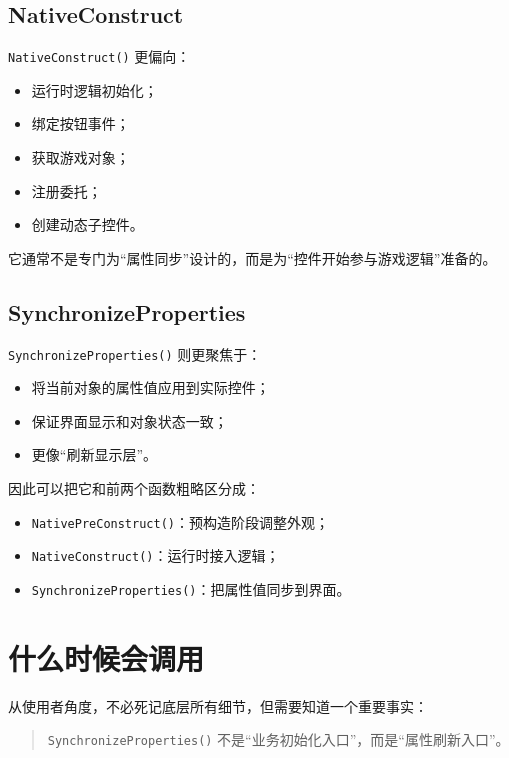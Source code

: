 \documentclass[10pt,CJKmath]{ctexart}
\begin{document}
\subsection{NativeConstruct}

\texttt{NativeConstruct()} 更偏向：

\begin{itemize}
	\item 运行时逻辑初始化；
	\item 绑定按钮事件；
	\item 获取游戏对象；
	\item 注册委托；
	\item 创建动态子控件。
\end{itemize}

它通常不是专门为“属性同步”设计的，而是为“控件开始参与游戏逻辑”准备的。

\subsection{SynchronizeProperties}

\texttt{SynchronizeProperties()} 则更聚焦于：

\begin{itemize}
	\item 将当前对象的属性值应用到实际控件；
	\item 保证界面显示和对象状态一致；
	\item 更像“刷新显示层”。
\end{itemize}

因此可以把它和前两个函数粗略区分成：

\begin{itemize}
	\item \texttt{NativePreConstruct()}：预构造阶段调整外观；
	\item \texttt{NativeConstruct()}：运行时接入逻辑；
	\item \texttt{SynchronizeProperties()}：把属性值同步到界面。
\end{itemize}

\section{什么时候会调用}

从使用者角度，不必死记底层所有细节，但需要知道一个重要事实：

\begin{quote}
	\texttt{SynchronizeProperties()} 不是“业务初始化入口”，而是“属性刷新入口”。
\end{quote}
\end{document}
